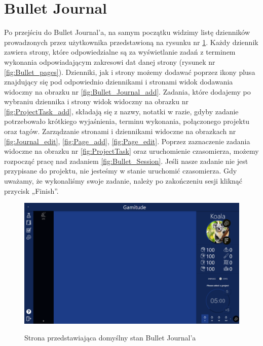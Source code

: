 \documentclass[a4paper,11pt]{report}
\begin{document}
\section{Bullet Journal}
Po przejściu do Bullet Journal’a, na samym początku widzimy listę dzienników prowadzonych przez użytkownika przedstawioną na rysunku nr \ref{fig:Bullet}.
Każdy dziennik zawiera strony, które odpowiedzialne są za wyświetlanie zadań z terminem wykonania odpowiadającym zakresowi dat danej strony (rysunek nr \ref{fig:Bullet_pages}).
Dzienniki, jak i strony możemy dodawać poprzez ikony plusa znajdujący się pod odpowiednio dziennikami i stronami widok dodawania widoczny na obrazku nr \ref{fig:Bullet_Journal_add}.
Zadania, które dodajemy po wybraniu dziennika i strony widok widoczny na obrazku nr \ref{fig:ProjectTask_add}, składają się z nazwy, notatki w razie, gdyby zadanie potrzebowało krótkiego wyjaśnienia,
 terminu wykonania, połączonego projektu oraz tagów.
 Zarządzanie stronami i dziennikami widoczne na obrazkach nr  \ref{fig:Journal_edit},  \ref{fig:Page_add},  \ref{fig:Page_edit}.
Poprzez zaznaczenie zadania widoczne na obrazku nr \ref{fig:ProjectTask}  oraz uruchomienie czasomierza, możemy rozpocząć pracę nad zadaniem \ref{fig:Bullet_Session}.
Jeśli nasze zadanie nie jest przypisane do projektu, nie jesteśmy w stanie uruchomić czasomierza.
Gdy uważamy, że wykonaliśmy swoje zadanie, należy po zakończeniu sesji kliknąć przycisk „Finish”.
\begin{figure}[H]
	\centering
	\includegraphics[scale=0.3]{prezentacja/Bullet}\\
	\caption{Strona przedstawiająca domyślny stan Bullet Journal’a}
	\label{fig:Bullet}
\end{figure}
\end{document}
